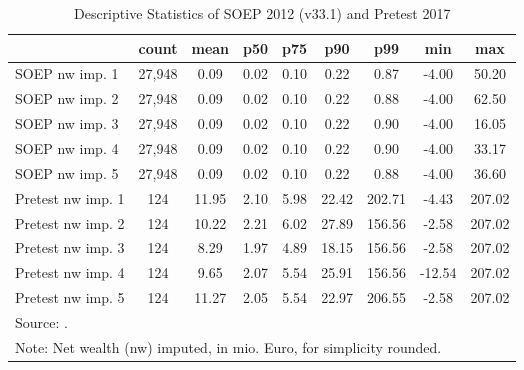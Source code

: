 \begin{table}[htbp]\centering
\def\sym#1{\ifmmode^{#1}\else\(^{#1}\)\fi}
\caption{Descriptive Statistics of SOEP 2012 (v33.1) and Pretest 2017}
\begin{tabular}{l*{1}{cccccccc}}
\hline\hline
                                            &       count&        mean&         p50&         p75&         p90&         p99&         min&         max\\
\hline
SOEP nw imp. 1                              &      27,948&        0.09&        0.02&        0.10&        0.22&        0.87&       -4.00&       50.20\\
SOEP nw imp. 2                              &      27,948&        0.09&        0.02&        0.10&        0.22&        0.88&       -4.00&       62.50\\
SOEP nw imp. 3                              &      27,948&        0.09&        0.02&        0.10&        0.22&        0.90&       -4.00&       16.05\\
SOEP nw imp. 4                              &      27,948&        0.09&        0.02&        0.10&        0.22&        0.90&       -4.00&       33.17\\
SOEP nw imp. 5                              &      27,948&        0.09&        0.02&        0.10&        0.22&        0.88&       -4.00&       36.60\\
Pretest nw imp. 1                           &         124&       11.95&        2.10&        5.98&       22.42&      202.71&       -4.43&      207.02\\
Pretest nw imp. 2                           &         124&       10.22&        2.21&        6.02&       27.89&      156.56&       -2.58&      207.02\\
Pretest nw imp. 3                           &         124&        8.29&        1.97&        4.89&       18.15&      156.56&       -2.58&      207.02\\
Pretest nw imp. 4                           &         124&        9.65&        2.07&        5.54&       25.91&      156.56&      -12.54&      207.02\\
Pretest nw imp. 5                           &         124&       11.27&        2.05&        5.54&       22.97&      206.55&       -2.58&      207.02\\
\hline\hline
\multicolumn{9}{l}{\footnotesize Source: .}\\
\multicolumn{9}{l}{\footnotesize Note: Net wealth (nw) imputed, in mio. Euro, for simplicity rounded.}\\
\end{tabular}
\end{table}
